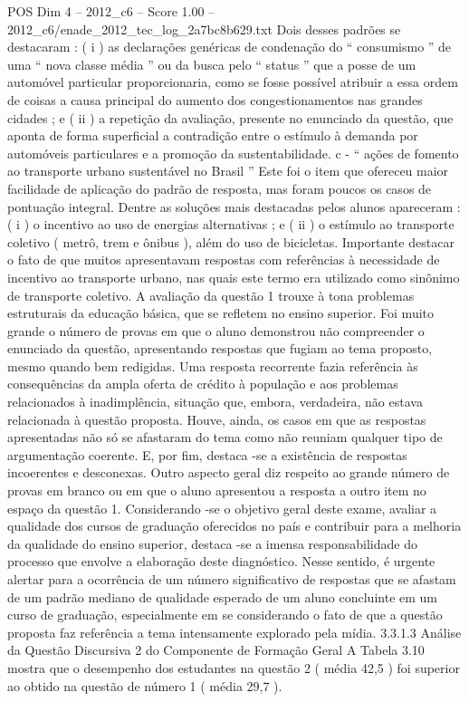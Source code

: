\begin{textsample}{POS Dim 4 – 2012\_c6 – Score 1.00 – 2012\_c6/enade\_2012\_tec\_log\_2a7bc8b629.txt}
Dois desses padrões se destacaram : ( i ) as declarações genéricas de condenação do “ consumismo ” de uma “ nova classe média ” ou da busca pelo “ status ” que a posse de um automóvel particular proporcionaria, como se fosse possível atribuir a essa ordem de coisas a causa principal do aumento dos congestionamentos nas grandes cidades ; e ( ii ) a repetição da avaliação, presente no enunciado da questão, que aponta de forma superficial a contradição entre o estímulo à demanda por automóveis particulares e a promoção da sustentabilidade. c - “ ações de fomento ao transporte urbano sustentável no Brasil ” Este foi o item que ofereceu maior facilidade de aplicação do padrão de resposta, mas foram poucos os casos de pontuação integral.
Dentre as soluções mais destacadas pelos alunos apareceram : ( i ) o incentivo ao uso de energias alternativas ; e ( ii ) o estímulo ao transporte coletivo ( metrô, trem e ônibus ), além do uso de bicicletas.
Importante destacar o fato de que muitos apresentavam respostas com referências à necessidade de incentivo ao transporte urbano, nas quais este termo era utilizado como sinônimo de transporte coletivo.
A avaliação da questão 1 trouxe à tona problemas estruturais da educação básica, que se refletem no ensino superior.
Foi muito grande o número de provas em que o aluno demonstrou não compreender o enunciado da questão, apresentando respostas que fugiam ao tema proposto, mesmo quando bem redigidas.
Uma resposta recorrente fazia referência às consequências da ampla oferta de crédito à população e aos problemas relacionados à inadimplência, situação que, embora, verdadeira, não estava relacionada à questão proposta.
Houve, ainda, os casos em que as respostas apresentadas não só se afastaram do tema como não reuniam qualquer tipo de argumentação coerente.
E, por fim, destaca -se a existência de respostas incoerentes e desconexas.
Outro aspecto geral diz respeito ao grande número de provas em branco ou em que o aluno apresentou a resposta a outro item no espaço da questão 1.
Considerando -se o objetivo geral deste exame, avaliar a qualidade dos cursos de graduação oferecidos no país e contribuir para a melhoria da qualidade do ensino superior, destaca -se a imensa responsabilidade do processo que envolve a elaboração deste diagnóstico.
Nesse sentido, é urgente alertar para a ocorrência de um número significativo de respostas que se afastam de um padrão mediano de qualidade esperado de um aluno concluinte em um curso de graduação, especialmente em se considerando o fato de que a questão proposta faz referência a tema intensamente explorado pela mídia. 3.3.1.3 Análise da Questão Discursiva 2 do Componente de Formação Geral A Tabela 3.10 mostra que o desempenho dos estudantes na questão 2 ( média 42,5 ) foi superior ao obtido na questão de número 1 ( média 29,7 ).

\end{textsample}
